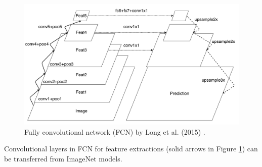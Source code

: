 \begin{figure}[t]
\centering
   \includegraphics[width=\linewidth]{img/fcn}
\caption{Fully convolutional network (FCN) by Long et al. (2015)  \cite{long2015fully}.}
\label{fig:fcn}
\end{figure}


Convolutional layers in FCN for feature extractions (solid arrows in Figure \ref{fig:fcn}) can be transferred from ImageNet models.
